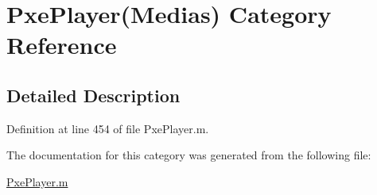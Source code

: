 \hypertarget{category_pxe_player_07_medias_08}{\section{Pxe\-Player(Medias) Category Reference}
\label{category_pxe_player_07_medias_08}
}


\subsection{Detailed Description}


Definition at line 454 of file Pxe\-Player.\-m.



The documentation for this category was generated from the following file\-:\begin{DoxyCompactItemize}
\item 
\hyperlink{_pxe_player_8m}{Pxe\-Player.\-m}\end{DoxyCompactItemize}
